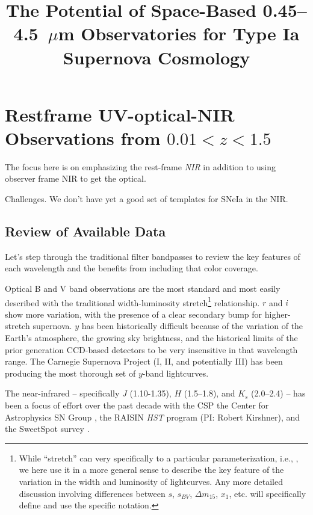 \title{The Potential of Space-Based 0.45--4.5~$\mu$m Observatories for Type Ia Supernova Cosmology}

\section{Restframe UV-optical-NIR Observations from $0.01<z<1.5$}

The focus here is on emphasizing the rest-frame {\em NIR} in addition to using observer frame NIR to get the optical.

Challenges.  We don't have yet a good set of templates for SNeIa in the NIR.

\subsection{Review of Available Data}
Let's step through the traditional filter bandpasses to review the key features of each wavelength and the benefits from including that color coverage.

Optical B and V band observations are the most standard and most easily described with the traditional width-luminosity stretch\footnote{While ``stretch'' can very specifically to a particular parameterization, i.e., \citet{Goldhaber02}, we here use it in a more general sense to describe the key feature of the variation in the width and luminosity of \snia lightcurves.  Any more detailed discussion involving differences between $s$, $s_{BV}$, $\Delta m_{15}$, $x_1$, etc. will specifically define and use the specific notation.} relationship.  $r$ and $i$ show more variation, with the presence of a clear secondary bump for higher-stretch supernova.  $y$ has been historically difficult because of the variation of the Earth's atmosphere, the growing sky brightness, and the historical limits of the prior generation CCD-based detectors to be very insensitive in that wavelength range.  The Carnegie Supernova Project (I, II, and potentially III) has been producing the most thorough set of $y$-band \snia lightcurves.

The near-infrared -- specifically $J$ (1.10-1.35), $H$ (1.5--1.8), and $K_s$ (2.0--2.4) -- has been a focus of effort over the past decade with the CSP \citep{Contreras11, Krisciunas17, } the Center for Astrophysics SN Group \citep{Wood-Vasey08,Friedman15}, the RAISIN {\it HST} program (PI: Robert Kirshner), and the SweetSpot survey \citep{Weyant14, Weyant17}.

